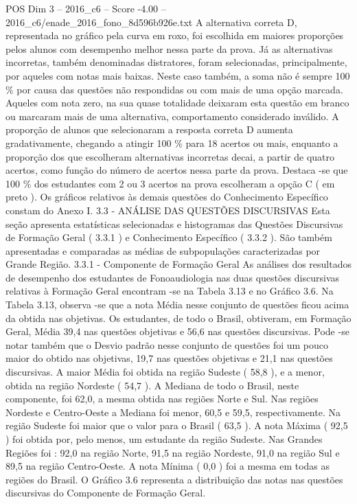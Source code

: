 \begin{textsample}{POS Dim 3 – 2016\_c6 – Score -4.00 – 2016\_c6/enade\_2016\_fono\_8d596b926e.txt}
A alternativa correta D, representada no gráfico pela curva em roxo, foi escolhida em maiores proporções pelos alunos com desempenho melhor nessa parte da prova.
Já as alternativas incorretas, também denominadas distratores, foram selecionadas, principalmente, por aqueles com notas mais baixas.
Neste caso também, a soma não é sempre 100 \% por causa das questões não respondidas ou com mais de uma opção marcada.
Aqueles com nota zero, na sua quase totalidade deixaram esta questão em branco ou marcaram mais de uma alternativa, comportamento considerado inválido.
A proporção de alunos que selecionaram a resposta correta D aumenta gradativamente, chegando a atingir 100 \% para 18 acertos ou mais, enquanto a proporção dos que escolheram alternativas incorretas decai, a partir de quatro acertos, como função do número de acertos nessa parte da prova.
Destaca -se que 100 \% dos estudantes com 2 ou 3 acertos na prova escolheram a opção C ( em preto ).
Os gráficos relativos às demais questões do Conhecimento Específico constam do Anexo I. 3.3 - ANÁLISE DAS QUESTÕES DISCURSIVAS Esta seção apresenta estatísticas selecionadas e histogramas das Questões Discursivas de Formação Geral ( 3.3.1 ) e Conhecimento Específico ( 3.3.2 ).
São também apresentadas e comparadas as médias de subpopulações caracterizadas por Grande Região. 3.3.1 - Componente de Formação Geral As análises dos resultados de desempenho dos estudantes de Fonoaudiologia nas duas questões discursivas relativas à Formação Geral encontram -se na Tabela 3.13 e no Gráfico 3.6.
Na Tabela 3.13, observa -se que a nota Média nesse conjunto de questões ficou acima da obtida nas objetivas.
Os estudantes, de todo o Brasil, obtiveram, em Formação Geral, Média 39,4 nas questões objetivas e 56,6 nas questões discursivas.
Pode -se notar também que o Desvio padrão nesse conjunto de questões foi um pouco maior do obtido nas objetivas, 19,7 nas questões objetivas e 21,1 nas questões discursivas.
A maior Média foi obtida na região Sudeste ( 58,8 ), e a menor, obtida na região Nordeste ( 54,7 ).
A Mediana de todo o Brasil, neste componente, foi 62,0, a mesma obtida nas regiões Norte e Sul.
Nas regiões Nordeste e Centro-Oeste a Mediana foi menor, 60,5 e 59,5, respectivamente.
Na região Sudeste foi maior que o valor para o Brasil ( 63,5 ).
A nota Máxima ( 92,5 ) foi obtida por, pelo menos, um estudante da região Sudeste.
Nas Grandes Regiões foi : 92,0 na região Norte, 91,5 na região Nordeste, 91,0 na região Sul e 89,5 na região Centro-Oeste.
A nota Mínima ( 0,0 ) foi a mesma em todas as regiões do Brasil.
O Gráfico 3.6 representa a distribuição das notas nas questões discursivas do Componente de Formação Geral.

\end{textsample}
